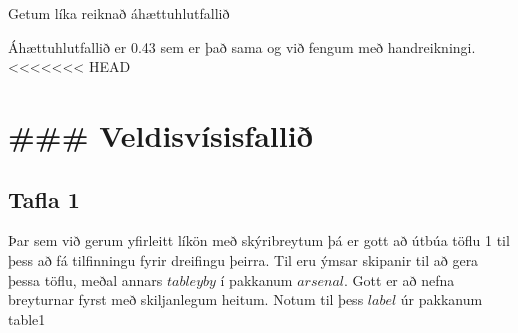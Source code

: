 \documentclass[
]{book}
\newenvironment{Shaded}{\begin{snugshade}}{\end{snugshade}}
\newcommand{\CommentTok}[1]{\textcolor[rgb]{0.56,0.35,0.01}{\textit{#1}}}
\newcommand{\DecValTok}[1]{\textcolor[rgb]{0.00,0.00,0.81}{#1}}
\newcommand{\KeywordTok}[1]{\textcolor[rgb]{0.13,0.29,0.53}{\textbf{#1}}}
\newcommand{\NormalTok}[1]{#1}
\newcommand{\OperatorTok}[1]{\textcolor[rgb]{0.81,0.36,0.00}{\textbf{#1}}}
\newcommand{\StringTok}[1]{\textcolor[rgb]{0.31,0.60,0.02}{#1}}
\begin{document}
Getum líka reiknað áhættuhlutfallið

\begin{Shaded}
\end{Shaded}

Áhættuhlutfallið er 0.43 sem er það sama og við fengum með handreikningi.\\
\textless\textless\textless\textless\textless\textless\textless{} HEAD

\hypertarget{veldisvuxedsisfalliuxf0}{%
\chapter{\#\#\# Veldisvísisfallið}\label{veldisvuxedsisfalliuxf0}}

\hypertarget{tafla-1}{%
\section{Tafla 1}\label{tafla-1}}

Þar sem við gerum yfirleitt líkön með skýribreytum þá er gott að útbúa töflu 1 til þess að fá tilfinningu fyrir dreifingu þeirra. Til eru ýmsar skipanir til að gera þessa töflu, meðal annars \(tableyby\) í pakkanum \(arsenal\). Gott er að nefna breyturnar fyrst með skiljanlegum heitum. Notum til þess \(label\) úr pakkanum table1

\begin{Shaded}
\end{Shaded}
\end{document}
